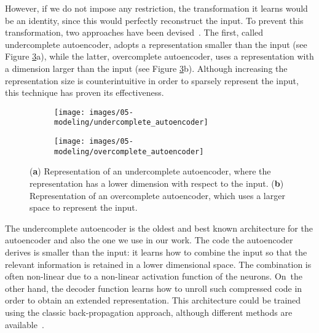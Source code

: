 However, if we do not impose any restriction, the transformation it learns would be an identity, since this would perfectly reconstruct the input. To prevent this transformation, two approaches have been devised~\cite{goodfellow_deep_2016}.
The first, called {undercomplete autoencoder}, adopts a representation smaller than the input (see Figure \ref{fig:under_over_autoencoder}a),
while the latter, {overcomplete autoencoder}, uses a representation with a dimension larger than the input (see Figure \ref{fig:under_over_autoencoder}b).
Although increasing the representation size is counterintuitive in order to sparsely represent the input, this technique has proven its effectiveness.

\begin{figure}[H]
\centering
\begin{subfigure}[H]{0.3\textwidth}
\centering
\texttt{[image: images/05-modeling/undercomplete\_autoencoder]}
\caption{}
\label{figure:undercomplete}
\end{subfigure}
\begin{subfigure}[H]{0.3\textwidth}
\centering
\texttt{[image: images/05-modeling/overcomplete\_autoencoder]}
\caption{}
\label{figure:overcomplete}
\end{subfigure}  \vspace{-6pt}
\caption{(\textbf{a}) Representation of an undercomplete autoencoder, where the representation has a lower dimension with respect to the input. (\textbf{b}) Representation of an overcomplete autoencoder, which uses a larger space to represent the input.}
\label{fig:under_over_autoencoder}
\end{figure}

The undercomplete autoencoder is the oldest and best known architecture for the autoencoder and also the one we use in our work. The code the autoencoder derives is smaller than the input: it learns how to combine the input so that the relevant information is retained in a lower dimensional space. The combination is often non-linear due to a non-linear activation function of the neurons. On~the other hand, the decoder function learns how to unroll such compressed code in order to obtain an extended representation. This architecture could be trained using the classic back-propagation approach, although different methods are available~\cite{goodfellow_deep_2016}.


